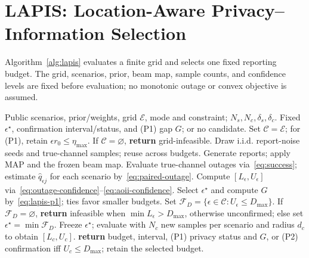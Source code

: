 \section{LAPIS: Location-Aware Privacy--Information Selection}
\label{sec:lapis}
Algorithm~\ref{alg:lapis} evaluates a finite grid and selects one fixed reporting budget. The grid, scenarios, prior, beam map, sample counts, and confidence levels are fixed before evaluation; no monotonic outage or convex objective is assumed.

\begin{algorithm}[t]
\caption{LAPIS: Fixed Privacy-Budget Selection}
\label{alg:lapis}
\footnotesize
\begin{algorithmic}[1]
\REQUIRE Public scenarios, prior/weights, grid $\mathcal E$, mode and constraint; $N_s,N_c,\delta_s,\delta_c$.
\ENSURE Fixed $\epsilon^\star$, confirmation interval/status, and (P1) gap $G$; or no candidate.
\STATE Set $\mathcal C=\mathcal E$; for (P1), retain $\epsilon r_0\le\eta_{\max}$.
\STATE If $\mathcal C=\varnothing$, \textbf{return} grid-infeasible.
\STATE Draw i.i.d. report-noise seeds and true-channel samples; reuse across budgets.
 \STATE Generate reports; apply MAP and the frozen beam map.
 \STATE Evaluate true-channel outages via~\eqref{eq:success}; estimate $\widehat q_{\epsilon j}$ for each scenario by~\eqref{eq:paired-outage}.
 \STATE Compute $[L_\epsilon,U_\epsilon]$ via~\eqref{eq:outage-confidence}--\eqref{eq:aoii-confidence}.
\ENDFOR
{}
 \STATE Select $\epsilon^\star$ and compute $G$ by~\eqref{eq:lapis-p1}; ties favor smaller budgets.
\ELSE
 \STATE Set $\mathcal F_D=\{\epsilon\in\mathcal C:U_\epsilon\le D_{\max}\}$.
 \STATE If $\mathcal F_D=\varnothing$, \textbf{return} infeasible when $\min L_\epsilon>D_{\max}$, otherwise unconfirmed; else set $\epsilon^\star=\min\mathcal F_D$.
\ENDIF
\STATE Freeze $\epsilon^\star$; evaluate with $N_c$ new samples per scenario and radius $d_c$ to obtain $[L_c,U_c]$.
\STATE \textbf{return} budget, interval, (P1) privacy status and $G$, or (P2) confirmation iff $U_c\le D_{\max}$; retain the selected budget.
\end{algorithmic}
\end{algorithm}

